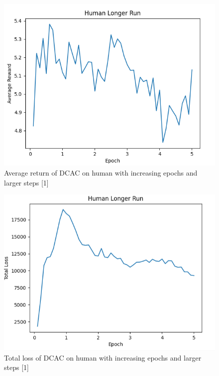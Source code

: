 \documentclass{article} %
\begin{document}
\begin{figure}[H]
\begin{center}
\includegraphics[scale=0.4]{images/longer_human_reward.png}
\end{center}
\caption{Average return of DCAC on human with increasing epochs and larger steps [1]}
\label{averageReturnLong}
\end{figure}

\begin{figure}[H]
\begin{center}
\includegraphics[scale=0.4]{images/longer_human_loss.png}
\end{center}
\caption{Total loss of DCAC on human with increasing epochs and larger steps [1]}
\label{totalLossLong}
\end{figure}
\end{document}
